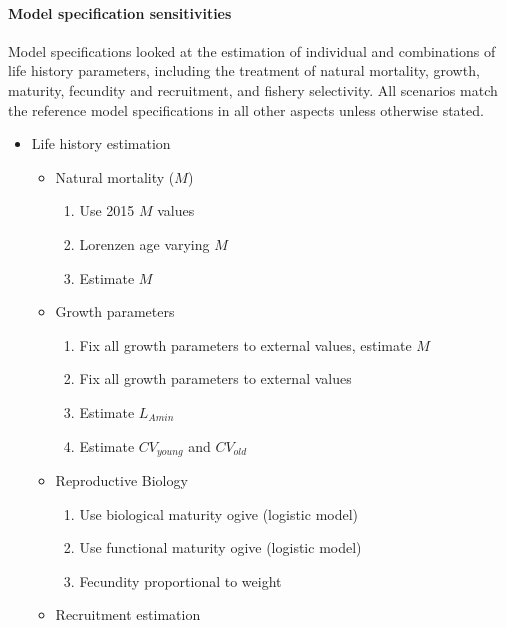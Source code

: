 \documentclass[11pt,
  letterpaper,
]{article}
\providecommand{\tightlist}{%
  \setlength{\itemsep}{0pt}\setlength{\parskip}{0pt}}
\providecommand{\tightlist}{%
  \setlength{\itemsep}{0pt}\setlength{\parskip}{0pt}}
\begin{document}
\hypertarget{model-specification-sensitivities}{%
\paragraph{Model specification sensitivities}\label{model-specification-sensitivities}}

Model specifications looked at the estimation of individual and combinations of life history parameters, including the treatment of natural mortality, growth, maturity, fecundity and recruitment, and fishery selectivity. All scenarios match the reference model specifications in all other aspects unless otherwise stated.

\begin{itemize}
\item
  Life history estimation

  \begin{itemize}
  \tightlist
  \item
    Natural mortality (\(M\))

    \begin{enumerate}
    \def\labelenumi{\arabic{enumi}.}
    \tightlist
    \item
      Use 2015 \(M\) values
    \item
      Lorenzen age varying \(M\)
    \item
      Estimate \(M\)
    \end{enumerate}
  \item
    Growth parameters

    \begin{enumerate}
    \def\labelenumi{\arabic{enumi}.}
    \setcounter{enumi}{3}
    \tightlist
    \item
      Fix all growth parameters to external values, estimate \(M\)
    \item
      Fix all growth parameters to external values
    \item
      Estimate \(L_{Amin}\)
    \item
      Estimate \(CV_{young}\) and \(CV_{old}\)
    \end{enumerate}
  \item
    Reproductive Biology

    \begin{enumerate}
    \def\labelenumi{\arabic{enumi}.}
    \setcounter{enumi}{7}
    \tightlist
    \item
      Use biological maturity ogive (logistic model)
    \item
      Use functional maturity ogive (logistic model)
    \item
      Fecundity proportional to weight
    \end{enumerate}
  \item
    Recruitment estimation


\end{itemize}
\end{itemize}
\end{document}
